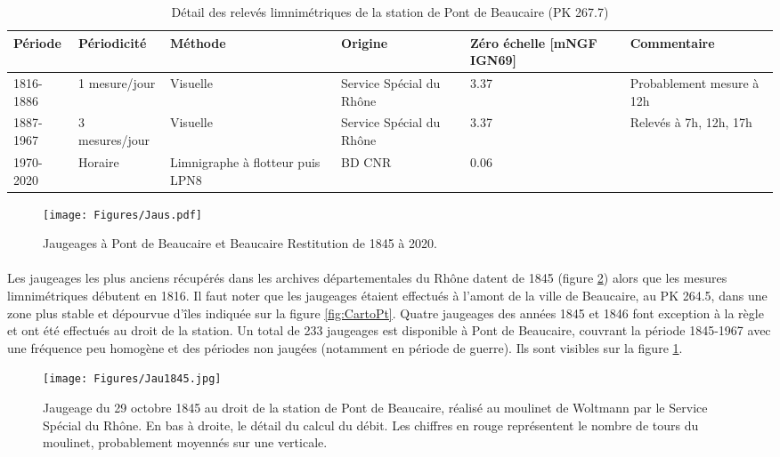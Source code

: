\documentclass[11pt]{article}
\begin{document}
    
	\begin{table}[h]
	\centering
	\caption{Détail des relevés limnimétriques de la station de Pont de Beaucaire (PK 267.7)}
    \label{tab:MesuresPtBcr}
       \begin{tabular}{| m{2cm} | m{2.6cm}| m{2.2cm} | m{3cm} | m{2.7cm} | m{2.5cm} |} 
                \hline
               Période & Périodicité & Méthode & Origine & Zéro échelle [mNGF IGN69] & Commentaire \\
                \hline
                1816-1886 & 1 mesure/jour & Visuelle & 
                Service Spécial du Rhône & 3.37 & Probablement mesure à 12h \\
                \hline
                1887-1967 & 3 mesures/jour & Visuelle & 
                Service Spécial du Rhône & 3.37 & Relevés à 7h, 12h, 17h\\
                \hline
               1970-2020 & Horaire & Limnigraphe à flotteur puis LPN8 & 
                BD CNR & 0.06 &  \\
                \hline
		\end{tabular}
       \end{table}       
       
        
    \begin{figure}[h]
	\centering
		\texttt{[image: Figures/Jaus.pdf]}
        \caption{Jaugeages à Pont de Beaucaire et Beaucaire Restitution de 1845 à 2020.}	
		\label{fig:JauAll}
	\end{figure}
       
    \paragraph{} Les jaugeages les plus anciens récupérés dans les archives départementales du Rhône datent de 1845 (figure \ref{fig:Jau1845}) alors que les mesures limnimétriques débutent en 1816. Il faut noter que les jaugeages étaient effectués à l'amont de la ville de Beaucaire, au PK 264.5, dans une zone plus stable et dépourvue d'îles indiquée sur la figure \ref{fig:CartoPt}. Quatre jaugeages des années 1845 et 1846 font exception à la règle et ont été effectués au droit de la station. Un total de 233 jaugeages est disponible à Pont de Beaucaire, couvrant la période 1845-1967 avec une fréquence peu homogène et des périodes non jaugées (notamment en période de guerre). Ils sont visibles sur la figure \ref{fig:JauAll}.
    
    \begin{figure}[h]
	\centering
		\texttt{[image: Figures/Jau1845.jpg]}
        \caption{Jaugeage du 29 octobre 1845 au droit de la station de Pont de Beaucaire, réalisé au moulinet de Woltmann par le Service Spécial du Rhône. En bas à droite, le détail du calcul du débit. Les chiffres en rouge représentent le nombre de tours du moulinet, probablement moyennés sur une verticale.}	
		\label{fig:Jau1845}
	\end{figure}
    	
\end{document}
